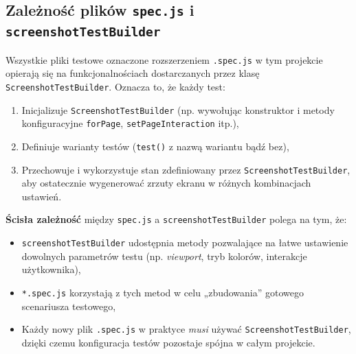 \documentclass[12pt]{report}
\begin{document}
\subsection{Zależność plików \texttt{spec.js} i \texttt{screenshotTestBuilder}}
\label{sec:zaleznosc-spec-builder}
Wszystkie pliki testowe oznaczone rozszerzeniem \texttt{.spec.js} w tym projekcie opierają się na funkcjonalnościach dostarczanych przez klasę \texttt{ScreenshotTestBuilder}. Oznacza to, że każdy test:
\begin{enumerate}
    \item Inicjalizuje \texttt{ScreenshotTestBuilder} (np. wywołując konstruktor i metody konfiguracyjne \texttt{forPage}, \texttt{setPageInteraction} itp.),
    \item Definiuje warianty testów (\texttt{test()} z nazwą wariantu bądź bez),
    \item Przechowuje i wykorzystuje stan zdefiniowany przez \texttt{ScreenshotTestBuilder}, aby ostatecznie wygenerować zrzuty ekranu w różnych kombinacjach ustawień.
\end{enumerate}

\noindent \textbf{Ścisła zależność} między \texttt{spec.js} a \texttt{screenshotTestBuilder} polega na tym, że:
\begin{itemize}
    \item \texttt{screenshotTestBuilder} udostępnia metody pozwalające na łatwe ustawienie dowolnych parametrów testu (np. \emph{viewport}, tryb kolorów, interakcje użytkownika),
    \item \texttt{*.spec.js} korzystają z tych metod w celu „zbudowania” gotowego scenariusza testowego,
    \item Każdy nowy plik \texttt{.spec.js} w praktyce \emph{musi} używać \texttt{ScreenshotTestBuilder}, dzięki czemu konfiguracja testów pozostaje spójna w całym projekcie.
\end{itemize}
\end{document}
